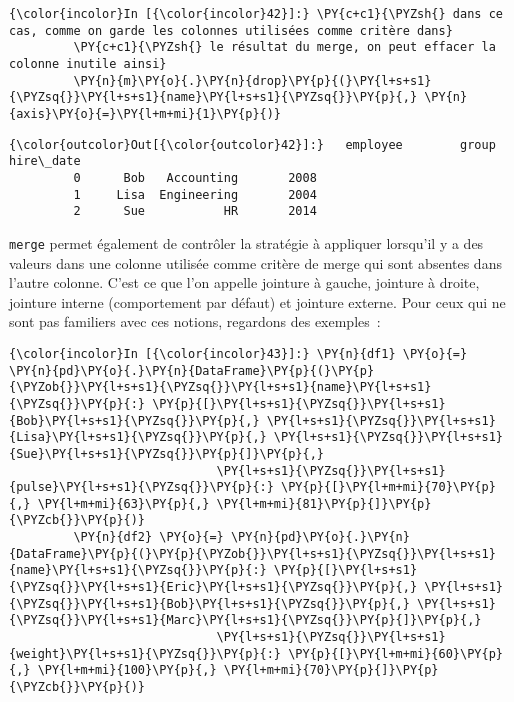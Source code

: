     \begin{Verbatim}[commandchars=\\\{\},frame=single,framerule=0.3mm,rulecolor=\color{cellframecolor}]
{\color{incolor}In [{\color{incolor}42}]:} \PY{c+c1}{\PYZsh{} dans ce cas, comme on garde les colonnes utilisées comme critère dans}
         \PY{c+c1}{\PYZsh{} le résultat du merge, on peut effacer la colonne inutile ainsi}
         \PY{n}{m}\PY{o}{.}\PY{n}{drop}\PY{p}{(}\PY{l+s+s1}{\PYZsq{}}\PY{l+s+s1}{name}\PY{l+s+s1}{\PYZsq{}}\PY{p}{,} \PY{n}{axis}\PY{o}{=}\PY{l+m+mi}{1}\PY{p}{)}
\end{Verbatim}


\begin{Verbatim}[commandchars=\\\{\},frame=single,framerule=0.3mm,rulecolor=\color{cellframecolor}]
{\color{outcolor}Out[{\color{outcolor}42}]:}   employee        group  hire\_date
         0      Bob   Accounting       2008
         1     Lisa  Engineering       2004
         2      Sue           HR       2014
\end{Verbatim}
            
    \texttt{merge} permet également de contrôler la stratégie à appliquer
lorsqu'il y a des valeurs dans une colonne utilisée comme critère de
merge qui sont absentes dans l'autre colonne. C'est ce que l'on appelle
jointure à gauche, jointure à droite, jointure interne (comportement par
défaut) et jointure externe. Pour ceux qui ne sont pas familiers avec
ces notions, regardons des exemples~:

    \begin{Verbatim}[commandchars=\\\{\},frame=single,framerule=0.3mm,rulecolor=\color{cellframecolor}]
{\color{incolor}In [{\color{incolor}43}]:} \PY{n}{df1} \PY{o}{=} \PY{n}{pd}\PY{o}{.}\PY{n}{DataFrame}\PY{p}{(}\PY{p}{\PYZob{}}\PY{l+s+s1}{\PYZsq{}}\PY{l+s+s1}{name}\PY{l+s+s1}{\PYZsq{}}\PY{p}{:} \PY{p}{[}\PY{l+s+s1}{\PYZsq{}}\PY{l+s+s1}{Bob}\PY{l+s+s1}{\PYZsq{}}\PY{p}{,} \PY{l+s+s1}{\PYZsq{}}\PY{l+s+s1}{Lisa}\PY{l+s+s1}{\PYZsq{}}\PY{p}{,} \PY{l+s+s1}{\PYZsq{}}\PY{l+s+s1}{Sue}\PY{l+s+s1}{\PYZsq{}}\PY{p}{]}\PY{p}{,}
                             \PY{l+s+s1}{\PYZsq{}}\PY{l+s+s1}{pulse}\PY{l+s+s1}{\PYZsq{}}\PY{p}{:} \PY{p}{[}\PY{l+m+mi}{70}\PY{p}{,} \PY{l+m+mi}{63}\PY{p}{,} \PY{l+m+mi}{81}\PY{p}{]}\PY{p}{\PYZcb{}}\PY{p}{)}
         \PY{n}{df2} \PY{o}{=} \PY{n}{pd}\PY{o}{.}\PY{n}{DataFrame}\PY{p}{(}\PY{p}{\PYZob{}}\PY{l+s+s1}{\PYZsq{}}\PY{l+s+s1}{name}\PY{l+s+s1}{\PYZsq{}}\PY{p}{:} \PY{p}{[}\PY{l+s+s1}{\PYZsq{}}\PY{l+s+s1}{Eric}\PY{l+s+s1}{\PYZsq{}}\PY{p}{,} \PY{l+s+s1}{\PYZsq{}}\PY{l+s+s1}{Bob}\PY{l+s+s1}{\PYZsq{}}\PY{p}{,} \PY{l+s+s1}{\PYZsq{}}\PY{l+s+s1}{Marc}\PY{l+s+s1}{\PYZsq{}}\PY{p}{]}\PY{p}{,}
                             \PY{l+s+s1}{\PYZsq{}}\PY{l+s+s1}{weight}\PY{l+s+s1}{\PYZsq{}}\PY{p}{:} \PY{p}{[}\PY{l+m+mi}{60}\PY{p}{,} \PY{l+m+mi}{100}\PY{p}{,} \PY{l+m+mi}{70}\PY{p}{]}\PY{p}{\PYZcb{}}\PY{p}{)}
\end{Verbatim}


